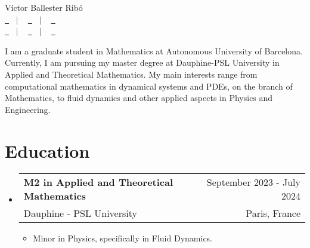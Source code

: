 \documentclass[a4paper,11pt]{article}
\makeatletter
\newcommand{\resumeQuadHeading}[4]{
  \item
  \begin{tabular*}{0.96\textwidth}[t]{l@{\extracolsep{\fill}}r}
    \textbf{#1} & \small #2 \\
    \small#3 & \small #4 \\
  \end{tabular*}
}
\newcommand{\resumeHeadingListStart}{
  \begin{itemize}[leftmargin=0.15in, label={}]
}
\newcommand{\resumeHeadingListEnd}{\end{itemize}}
\makeatother
\begin{document}
\begin{center}
  {\Huge Víctor Ballester Ribó\vspace{2pt}} \\[1.25pc]
  \href{https://victorballester7.github.io}{\faLink \ } \ $|$ \ %
  \href{https://www.linkedin.com/in/victorballester7}{\faLinkedinSquare \ } \ $|$ \ %
  \href{https://www.github.com/victorballester7}{\faGithub \ } \\[0.1pc] %
  \href{tel:+33765750262}{\faPhone \ } \ $|$ \ %
  \href{mailto:victor.ballester-ribo@dauphine.eu}{\faEnvelope \ } \ $|$ \ %
  \href{https://maps.app.goo.gl/mBsBKy4iHiBFkVGz5}{\faHome \ } \\[1.5pc] %
\end{center}

\begin{justify}
  I am a graduate student in Mathematics at Autonomous University of Bar\-ce\-lo\-na. Currently, I am pursuing my master degree at Dauphine-PSL University in Applied and Theoretical Mathematics. My main interests range from computational mathematics in dynamical systems and PDEs, on the branch of Math\-e\-mat\-ics, to fluid dynamics and other applied aspects in Physics and Engineering.
\end{justify}



\section{Education}
\resumeHeadingListStart{}
\resumeQuadHeading{M2 in Applied and Theoretical Mathematics}{September 2023 - July 2024}
{Dauphine - PSL University}{Paris, France}
\begin{itemize}[leftmargin=3em, itemsep=0.1em, topsep=2pt]
  \item \small Minor in Physics, specifically in Fluid Dynamics.
\end{itemize}
\resumeHeadingListEnd{}
\end{document}
